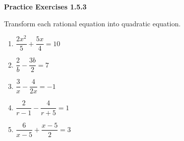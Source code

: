 \noindent\textbf{Practice Exercises 1.5.3}


Transform each rational equation into quadratic equation. 
\begin{multicols}{2}
\begin{enumerate}[label = \color{blue}\arabic*. ]
\item $ \dfrac{2x^{2}}{5} + \dfrac{5x}{4} = 10 $
\item $ \dfrac{2}{b} - \dfrac{3b}{2} = 7 $
\item $ \dfrac{3}{x} - \dfrac{4}{2x} = -1 $
\item $ \dfrac{2}{r-1} - \dfrac{4}{r+5} = 1 $
\item $ \dfrac{6}{x-5} + \dfrac{x-5}{2} = 3 $
\end{enumerate}
\end{multicols} 
